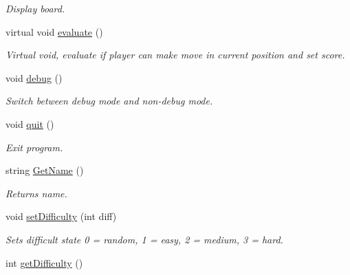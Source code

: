 \begin{DoxyCompactItemize}
\begin{DoxyCompactList}\small\item\em Display board. \end{DoxyCompactList}\item 
\hypertarget{class_game_a3bc8822cacd9cf8c5f71021072eb24a4}{virtual void \hyperlink{class_game_a3bc8822cacd9cf8c5f71021072eb24a4}{evaluate} ()}\label{class_game_a3bc8822cacd9cf8c5f71021072eb24a4}

\begin{DoxyCompactList}\small\item\em Virtual void, evaluate if player can make move in current position and set score. \end{DoxyCompactList}\item 
\hypertarget{class_game_a29997a321e10a5456f0aef9e95c51757}{void \hyperlink{class_game_a29997a321e10a5456f0aef9e95c51757}{debug} ()}\label{class_game_a29997a321e10a5456f0aef9e95c51757}

\begin{DoxyCompactList}\small\item\em Switch between debug mode and non-\/debug mode. \end{DoxyCompactList}\item 
\hypertarget{class_game_a8272be134d16c277bb014ad6a22fc357}{void \hyperlink{class_game_a8272be134d16c277bb014ad6a22fc357}{quit} ()}\label{class_game_a8272be134d16c277bb014ad6a22fc357}

\begin{DoxyCompactList}\small\item\em Exit program. \end{DoxyCompactList}\item 
\hypertarget{class_game_ab81299d944d2779d482067640e576389}{string \hyperlink{class_game_ab81299d944d2779d482067640e576389}{Get\-Name} ()}\label{class_game_ab81299d944d2779d482067640e576389}

\begin{DoxyCompactList}\small\item\em Returns name. \end{DoxyCompactList}\item 
\hypertarget{class_game_ae8ac0005c039f0f5f2dd1c10a299fe8d}{void \hyperlink{class_game_ae8ac0005c039f0f5f2dd1c10a299fe8d}{set\-Difficulty} (int diff)}\label{class_game_ae8ac0005c039f0f5f2dd1c10a299fe8d}

\begin{DoxyCompactList}\small\item\em Sets difficult state 0 = random, 1 = easy, 2 = medium, 3 = hard. \end{DoxyCompactList}\item 
\hypertarget{class_game_a2c0efe888e453a7fc0e644503fbd6316}{int \hyperlink{class_game_a2c0efe888e453a7fc0e644503fbd6316}{get\-Difficulty} ()}\label{class_game_a2c0efe888e453a7fc0e644503fbd6316}


\end{DoxyCompactItemize}
